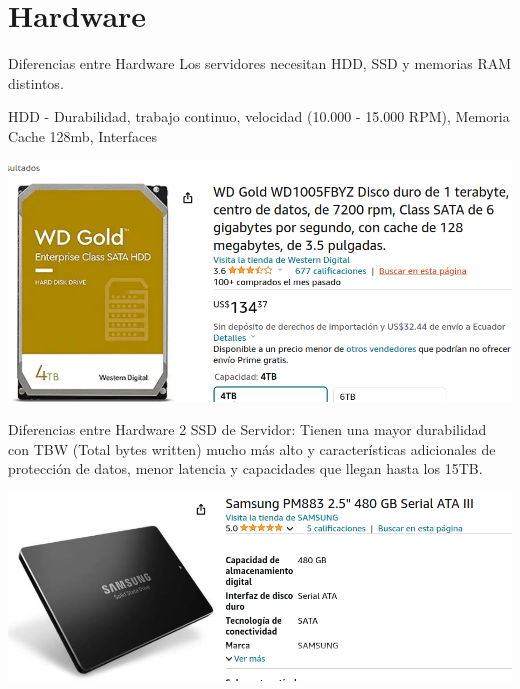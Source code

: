 \documentclass[presentation]{beamer}
\begin{document}
\section{Hardware}
\label{sec:org1c5df73}
\begin{frame}[label={sec:org3294242}]{Diferencias entre Hardware}
Los servidores necesitan HDD, SSD y memorias RAM distintos.

HDD - Durabilidad, trabajo continuo, velocidad (10.000 - 15.000 RPM), Memoria Cache 128mb, Interfaces
\begin{center}
\includegraphics[width=.9\linewidth]{./imagenes/HDD_Servidor.png}
\end{center}
\end{frame}

\begin{frame}[label={sec:orgc5e9bdf}]{Diferencias entre Hardware 2}
SSD de Servidor: Tienen una mayor durabilidad con TBW (Total bytes written) mucho más alto y características adicionales de protección de datos, menor latencia y capacidades que llegan hasta los 15TB.
\begin{center}
\includegraphics[width=.9\linewidth]{./imagenes/SSDserver.png}
\end{center}
\end{frame}
\end{document}
